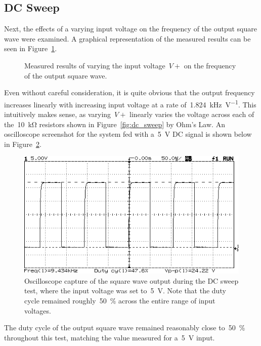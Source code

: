 \subsection{DC Sweep}
Next, the effects of a varying input voltage on the frequency of the output
square wave were examined.  A graphical representation of the measured results
can be seen in Figure~\ref{fig:dc_sweep_plot}.
%
\begin{figure}[H]
	\centering
	
	\parbox{.6\textwidth}{
	\caption[DC Sweep Results]{Measured results of varying the input
	voltage~$V+$ on the frequency of the output square wave.}
	\label{fig:dc_sweep_plot}}
\end{figure}
%
Even without careful consideration, it is quite obvious that the output
frequency increases linearly with increasing input voltage at a rate
of~\SI{1.824}{\kilo\hertz\per\volt}.  This intuitively makes sense, as
varying~$V+$ linearly varies the voltage across each of the~\SI{10}{\kilo\ohm}
resistors shown in Figure~\ref{fig:dc_sweep} by Ohm's Law.  An oscilloscope
screenshot for the system fed with a~\SI{5}{\volt} DC signal is shown below in
Figure~\ref{fig:shot5}.
%
\begin{figure}[H]
	\centering
	\includegraphics[width=.6\textwidth]{img/shot/shot5.png}
	\parbox{.6\textwidth}{
	\caption[DC Sweep at \SI{5}{\volt}]{Oscilloscope capture of the square wave
	output during the DC sweep test, where the input voltage was set
	to~\SI{5}{\volt}.  Note that the duty cycle remained
	roughly~\SI{50}{\percent} across the entire range of input voltages.}
	\label{fig:shot5}}
\end{figure}
%
The duty cycle of the output square wave remained reasonably close
to~\SI{50}{\percent} throughout this test, matching the value measured for
a~\SI{5}{\volt} input.

